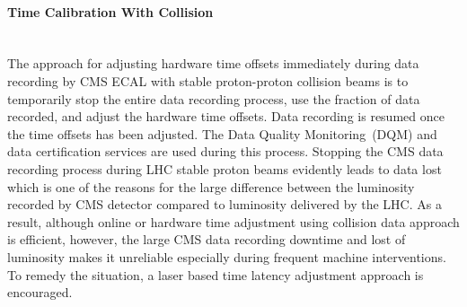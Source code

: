 \paragraph{Time Calibration With Collision} \mbox{}\\
The approach for adjusting hardware time offsets immediately during data recording by CMS ECAL with stable proton-proton collision beams is to temporarily stop the entire data recording process, use the fraction of data recorded, and adjust the hardware time offsets. Data recording is resumed once the time offsets has been adjusted. The  Data Quality Monitoring~(DQM) and
data certification services are used during this process. Stopping the CMS data recording process during LHC stable proton beams evidently leads to data lost which is one of the reasons for the large difference between the luminosity recorded by CMS detector compared to luminosity delivered by the LHC.
As a result, although online or hardware time adjustment using collision data approach is efficient, however, the large CMS data recording downtime and lost of luminosity makes it unreliable especially during frequent machine interventions.
To remedy the situation, a laser based time latency adjustment approach is encouraged.
